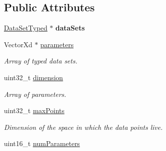 \subsection*{Public Attributes}
\begin{DoxyCompactItemize}
\item 
\hypertarget{struct_d_r_d_s_p_1_1_data_system_typed_a19267fafd70c07c177b9992468704504}{\hyperlink{struct_d_r_d_s_p_1_1_data_set_typed}{Data\-Set\-Typed} $\ast$ {\bfseries data\-Sets}}\label{struct_d_r_d_s_p_1_1_data_system_typed_a19267fafd70c07c177b9992468704504}

\item 
\hypertarget{struct_d_r_d_s_p_1_1_data_system_typed_a14e96a1e32444f7a799e3d5552317aa5}{Vector\-Xd $\ast$ \hyperlink{struct_d_r_d_s_p_1_1_data_system_typed_a14e96a1e32444f7a799e3d5552317aa5}{parameters}}\label{struct_d_r_d_s_p_1_1_data_system_typed_a14e96a1e32444f7a799e3d5552317aa5}

\begin{DoxyCompactList}\small\item\em Array of typed data sets. \end{DoxyCompactList}\item 
\hypertarget{struct_d_r_d_s_p_1_1_data_system_typed_a2b4eaddeb36714703850fdb92050ca0a}{uint32\-\_\-t \hyperlink{struct_d_r_d_s_p_1_1_data_system_typed_a2b4eaddeb36714703850fdb92050ca0a}{dimension}}\label{struct_d_r_d_s_p_1_1_data_system_typed_a2b4eaddeb36714703850fdb92050ca0a}

\begin{DoxyCompactList}\small\item\em Array of parameters. \end{DoxyCompactList}\item 
\hypertarget{struct_d_r_d_s_p_1_1_data_system_typed_a02ab7e32e3df6e667e176144520c339c}{uint32\-\_\-t \hyperlink{struct_d_r_d_s_p_1_1_data_system_typed_a02ab7e32e3df6e667e176144520c339c}{max\-Points}}\label{struct_d_r_d_s_p_1_1_data_system_typed_a02ab7e32e3df6e667e176144520c339c}

\begin{DoxyCompactList}\small\item\em Dimension of the space in which the data points live. \end{DoxyCompactList}\item 
\hypertarget{struct_d_r_d_s_p_1_1_data_system_typed_a965e1066f9c4449413add3978a4cb0af}{uint16\-\_\-t \hyperlink{struct_d_r_d_s_p_1_1_data_system_typed_a965e1066f9c4449413add3978a4cb0af}{num\-Parameters}}\label{struct_d_r_d_s_p_1_1_data_system_typed_a965e1066f9c4449413add3978a4cb0af}


\end{DoxyCompactItemize}
